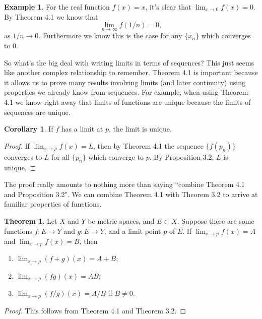 \documentclass{article}
\theoremstyle{definition}
\newtheorem{theorem}{Theorem}[section]
\newtheorem{corollary}{Corollary}[section]
\newtheorem{example}{Example}[section]
\begin{document}
\begin{example}
	For the real function $ f(x)=x $, it's clear that $ \lim_{x\to 0}f(x)=0 $. By Theorem 4.1 we know that $$ \lim\limits_{n\to\infty}f(1/n)=0,$$ as $ 1/n\to0 $. Furthermore we know this is the case for any $ \{x_n\} $ which converges to $ 0 $.  
\end{example}
So what's the big deal with writing limits in terms of sequences? This just seems like another complex relationship to remember. Theorem 4.1 is important because it allows us to prove many results involving limits (and later continuity) using properties we already know from sequences. For example, when using Theorem 4.1 we  know right away that limits of functions are unique because the limits of sequences are unique. 
\begin{corollary}
	If $ f $ has a limit at $ p $, the limit is unique.
\end{corollary}
\begin{proof}
If $ \lim_{x\to p}f(x)=L $, then by Theorem 4.1 the sequence $ \{f(p_n)\} $ converges to $ L $ for all $ \{p_n\} $ which converge to $ p $. By Proposition 3.2, $ L $ is unique. 
\end{proof}
The proof really amounts to nothing more than saying ``combine Theorem 4.1 and Proposition 3.2". We can combine Theorem 4.1 with Theorem 3.2 to arrive at familiar properties of functions. 
\begin{theorem}
	Let $ X $ and $ Y $ be metric spaces, and $ E\subset X $. Suppose there are some functions $ f:E\to Y $ and $ g:E\to Y $, and a limit point $ p $ of $ E $. If $ \lim_{x\to p}f(x)=A $ and $ \lim_{x\to p}f(x)=B $, then
	\begin{enumerate}
		\item $ \lim_{x\to p}(f+g)(x)=A+B $;
		\item $ \lim_{x\to p}(fg)(x)=AB $;
		\item $ \lim_{x\to p}(f/g)(x)=A/B $ if $ B\neq 0 $.
	\end{enumerate}
\end{theorem}
\begin{proof}
	This follows from Theorem 4.1 and Theorem 3.2.
\end{proof}
\end{document}
